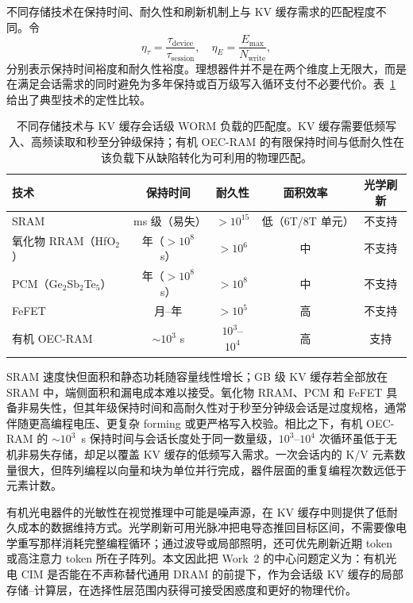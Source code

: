 不同存储技术在保持时间、耐久性和刷新机制上与 KV 缓存需求的匹配程度不同。令
\begin{equation}
\eta_{\tau} = \frac{\tau_{\text{device}}}{\tau_{\text{session}}}, \quad \eta_{E} = \frac{E_{\text{max}}}{N_{\text{write}}},
\label{eq:match_metrics}
\end{equation}
分别表示保持时间裕度和耐久性裕度。理想器件并不是在两个维度上无限大，而是在满足会话需求的同时避免为多年保持或百万级写入循环支付不必要代价。表~\ref{tab:kv_tech_match} 给出了典型技术的定性比较。

\begin{table}[!htbp]
\centering
\caption{不同存储技术与 KV 缓存会话级 WORM 负载的匹配度。KV 缓存需要低频写入、高频读取和秒至分钟级保持；有机 OEC-RAM 的有限保持时间与低耐久性在该负载下从缺陷转化为可利用的物理匹配。}
\label{tab:kv_tech_match}
\begin{tabular}{@{}lcccc@{}}
\toprule
技术 & 保持时间 & 耐久性 & 面积效率 & 光学刷新 \\
\midrule
SRAM & ms 级（易失） & $>10^{15}$ & 低（6T/8T 单元） & 不支持 \\
氧化物 RRAM（HfO$_2$） & 年（$>10^8$ s） & $>10^{6}$ & 中 & 不支持 \\
PCM（Ge$_2$Sb$_2$Te$_5$） & 年（$>10^8$ s） & $>10^{8}$ & 中 & 不支持 \\
FeFET & 月--年 & $>10^{5}$ & 高 & 不支持 \\
有机 OEC-RAM & $\sim 10^3$ s & $10^3$--$10^4$ & 高 & 支持 \\
\bottomrule
\end{tabular}
\end{table}

SRAM 速度快但面积和静态功耗随容量线性增长；GB 级 KV 缓存若全部放在 SRAM 中，端侧面积和漏电成本难以接受。氧化物 RRAM、PCM 和 FeFET 具备非易失性，但其年级保持时间和高耐久性对于秒至分钟级会话是过度规格，通常伴随更高编程电压、更复杂 forming 或更严格写入校验。相比之下，有机 OEC-RAM 的 $\sim 10^3$~s 保持时间与会话长度处于同一数量级，$10^3$--$10^4$ 次循环虽低于无机非易失存储，却足以覆盖 KV 缓存的低频写入需求。一次会话内的 K/V 元素数量很大，但阵列编程以向量和块为单位并行完成，器件层面的重复编程次数远低于元素计数。

有机光电器件的光敏性在视觉推理中可能是噪声源，在 KV 缓存中则提供了低耐久成本的数据维持方式。光学刷新可用光脉冲把电导态推回目标区间，不需要像电学重写那样消耗完整编程循环；通过波导或局部照明，还可优先刷新近期 token 或高注意力 token 所在子阵列。本文因此把 Work~2 的中心问题定义为：有机光电 CIM 是否能在不声称替代通用 DRAM 的前提下，作为会话级 KV 缓存的局部存储--计算层，在选择性层范围内获得可接受困惑度和更好的物理代价。

